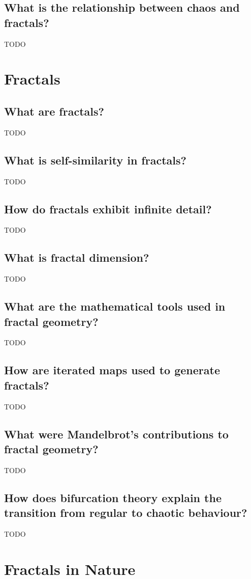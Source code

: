 \documentclass[12pt]{article}
\begin{document}
\subsection{What is the relationship between chaos and fractals?}
TODO

\section{Fractals}
\subsection{What are fractals?}
TODO

\subsection{What is self-similarity in fractals?}
TODO

\subsection{How do fractals exhibit infinite detail?}
TODO

\subsection{What is fractal dimension?}
TODO

\subsection{What are the mathematical tools used in fractal geometry?}
TODO

\subsection{How are iterated maps used to generate fractals?}
TODO

\subsection{What were Mandelbrot's contributions to fractal geometry?}
TODO

\subsection{How does bifurcation theory explain the transition from regular to chaotic behaviour?}
TODO

\section{Fractals in Nature}
\end{document}

